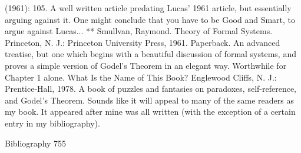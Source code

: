  (1961): 105. A well written article predating Lucas' 1961 article, but essentially arguing
  against it. One might conclude that you have to be Good and Smart, to argue against
  Lucas...
** Smullvan, Raymond. Theory of Formal Systems. Princeton, N. J.: Princeton
  University Press, 1961. Paperback. An advanced treatise, but one which begins with a
  beautiful discussion of formal systems, and proves a simple version of Godel's Theorem
  in an elegant way. Worthwhile for Chapter 1 alone. What Is the Name of This Book?
  Englewood Cliffs, N. J.: Prentice-Hall, 1978. A book of puzzles and fantasies on
  paradoxes, self-reference, and Godel's Theorem. Sounds like it will appeal to many of
  the same readers as my book. It appeared after mine was all written (with the exception
  of a certain entry in my bibliography).

Bibliography                                                                            755

